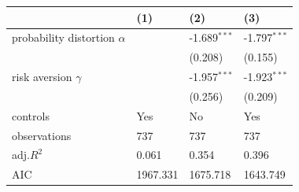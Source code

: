 \begin{tabular}{llll}
\hline
 & (1) & (2) & (3) \\
\hline
probability distortion $\alpha$ &  & -1.689$^{***}$ & -1.797$^{***}$ \\
 &  & (0.208) & (0.155) \\
risk aversion $\gamma$ &  & -1.957$^{***}$ & -1.923$^{***}$ \\
 &  & (0.256) & (0.209) \\
controls & Yes & No & Yes \\
observations & 737 & 737 & 737 \\
adj.$R^2$ & 0.061 & 0.354 & 0.396 \\
AIC & 1967.331 & 1675.718 & 1643.749 \\
\hline
\end{tabular}
